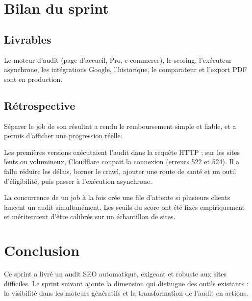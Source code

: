 \section{Bilan du sprint}
\subsection{Livrables}
Le moteur d'audit (page d'accueil, Pro, e-commerce), le scoring, l'exécuteur asynchrone, les intégrations Google, l'historique, le comparateur et l'export PDF sont en production.

\subsection{Rétrospective}
\begin{description}[leftmargin=1.2em,style=nextline]
  \item[Ce qui a bien fonctionné.] Séparer le job de son résultat a rendu le remboursement simple et fiable, et a permis d'afficher une progression réelle.
  \item[Ce qui a posé problème.] Les premières versions exécutaient l'audit dans la requête HTTP ; sur les sites lents ou volumineux, Cloudflare coupait la connexion (erreurs 522 et 524). Il a fallu réduire les délais, borner le crawl, ajouter une route de santé et un outil d'éligibilité, puis passer à l'exécution asynchrone.
  \item[À améliorer.] La concurrence de un job à la fois crée une file d'attente si plusieurs clients lancent un audit simultanément. Les seuils du score ont été fixés empiriquement et mériteraient d'être calibrés sur un échantillon de sites.
\end{description}

\section{Conclusion}
Ce sprint a livré un audit SEO automatique, exigeant et robuste aux sites difficiles. Le sprint suivant ajoute la dimension qui distingue \xapp{} des outils existants : la visibilité dans les moteurs génératifs et la transformation de l'audit en actions.
